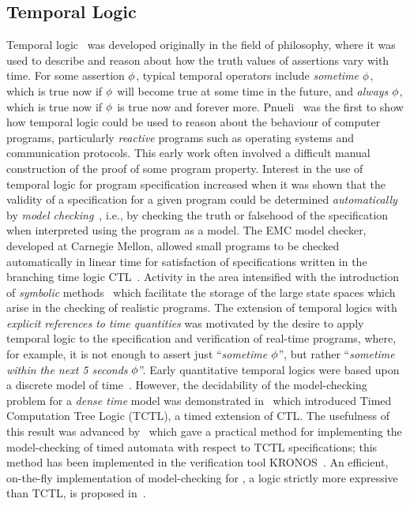 {\subsection{Temporal Logic\label{ss:msctemporallogic}}
Temporal logic~\cite{eme:90} was developed originally in the field of
philosophy, where it was used to describe and reason about how the
truth values of assertions vary with time. For some assertion $\phi$,
typical temporal operators include \emph{sometime} $\phi$, which is
true now if $\phi$ will become true at some time in the future, and
\emph{always} $\phi$, which is true now if $\phi$ is true now and
forever more. Pnueli~\cite{pnu:77} was the first to show how temporal
logic could be used to reason about the behaviour of computer
programs, particularly \emph{reactive} programs such as operating
systems and communication protocols. This early work often involved a
difficult manual construction of the proof of some program property.
Interest in the use of temporal logic for program specification
increased when it was shown that the validity of a specification for a
given program could be determined \emph{automatically} by \emph{model
checking}~\cite{ce:81,qs:81}, i.e., by checking the truth or falsehood
of the specification when interpreted using the program as a
model. The EMC model checker, developed at Carnegie Mellon, allowed
small programs to be checked automatically in linear time for
satisfaction of specifications written in the branching time logic
CTL~\cite{ces:86}. Activity in the area intensified with the
introduction of \emph{symbolic} methods~\cite{bcm:92,mcm:92} which
facilitate the storage of the large state spaces which arise in the
checking of realistic programs. The extension of temporal logics with
\emph{explicit references to time quantities} was motivated by the
desire to apply temporal logic to the specification and verification
of real-time programs, where, for example, it is not enough to assert
just ``\emph{sometime} $\phi$'', but rather ``\emph{sometime within
the next 5 seconds} $\phi$''. Early quantitative temporal logics were
based upon a discrete model of
time~\cite{ah:93,eme:91,ems:90,hlp:90,ost:86}.  However, the
decidability of the model-checking problem for a
\emph{dense time} model was demonstrated in~\cite{acd:90} which
introduced Timed Computation Tree Logic (TCTL), a timed extension of
CTL. The usefulness of this result was advanced by~\cite{hnsy:94}
which gave a practical method for implementing the model-checking of
timed automata with respect to TCTL specifications; this method has
been implemented in the verification tool KRONOS~\cite{bdm:98}. An
efficient, on-the-fly implementation of model-checking for \etctl, a
logic strictly more expressive than TCTL, is proposed
in~\cite{bty:97}.

}
